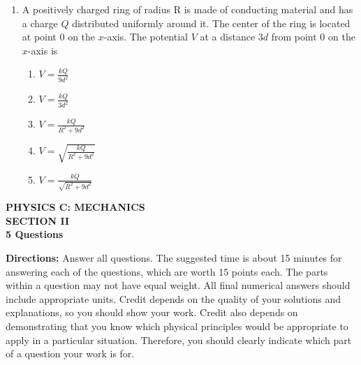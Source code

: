 \documentclass[11pt]{article}
\begin{document}
\begin{multicols}{2}
\begin{enumerate}[leftmargin=18pt]
  \item A positively charged ring of radius R is made of conducting material and
    has a charge $Q$ distributed uniformly around it. The center of the ring is
    located at point 0 on the $x$-axis. The potential $V$ at a distance $3d$
    from point 0 on the $x$-axis is
    \begin{enumerate}[noitemsep,topsep=0pt,leftmargin=18pt,label=(\Alph*)]  
    \item $\displaystyle V=\frac{kQ}{9d^2}$
    \item $\displaystyle V=\frac{kQ}{3d^2}$
    \item $\displaystyle V=\frac{kQ}{R^2+9d^2}$
    \item $\displaystyle V=\sqrt{\frac{kQ}{R^2+9d^2}}$
    \item $\displaystyle V=\frac{kQ}{\sqrt{R^2+9d^2}}$
    \end{enumerate}
  \end{enumerate}
  \columnbreak
\end{multicols}

\newpage
\begin{center}
  \textbf{
    PHYSICS C: MECHANICS\\
    SECTION II\\
    5 Questions}
\end{center}

\textbf{Directions:} Answer all questions. The suggested time is about 15
minutes for answering each of the questions, which are worth 15 points each.
The parts within a question may not have equal weight. All final numerical
answers should include appropriate units. Credit depends on the quality of your
solutions and explanations, so you should show your work. Credit also depends
on demonstrating that you know which physical principles would be appropriate
to apply in a particular situation. Therefore, you should clearly indicate
which part of a question your work is for.
\end{document}
